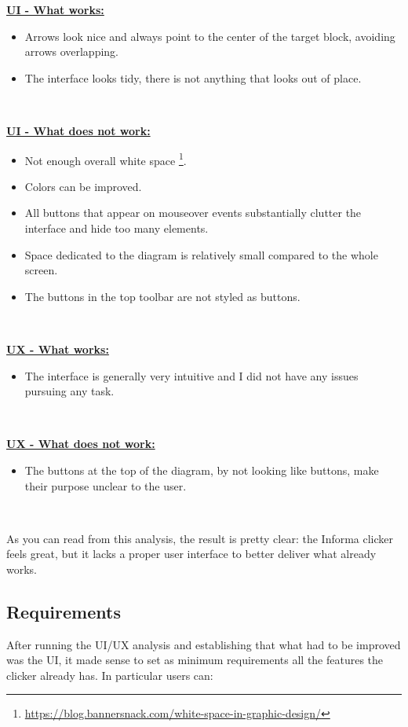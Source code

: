 \documentclass[]{usiinfbachelorproject}
\begin{document}
\textbf{\ul{UI - What works:}}

\begin{itemize}
	\item Arrows look nice and always point to the center of the target block, avoiding arrows overlapping.
	\item The interface looks tidy, there is not anything that looks out of place.
\end{itemize}\

\textbf{\ul{UI - What does not work:}}

\begin{itemize}
	\item Not enough overall white space \footnote{\url{https://blog.bannersnack.com/white-space-in-graphic-design/}}.
	\item Colors can be improved.
	\item All buttons that appear on mouseover events substantially clutter the interface and hide too many elements.
	\item Space dedicated to the diagram is relatively small compared to the whole screen.
	\item The buttons in the top toolbar are not styled as buttons.
\end{itemize}\

\textbf{\ul{UX - What works:}}

\begin{itemize}
	\item The interface is generally very intuitive and I did not have any issues pursuing any task.
\end{itemize}\

\textbf{\ul{UX - What does not work:}}

\begin{itemize}
	\item The buttons at the top of the diagram, by not looking like buttons, make their purpose unclear to the user.
\end{itemize}\

\noindent As you can read from this analysis, the result is pretty clear: the Informa clicker feels great, but it lacks a proper user interface to better deliver what already works.

\subsection{Requirements}

After running the UI/UX analysis and establishing that what had to be improved was the UI, it made sense to set as minimum requirements all the features the clicker already has. In particular users can:
\end{document}
